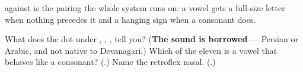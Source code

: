 \textbf{} against \textbf{} is the pairing the whole system runs on: a vowel gets a full-size letter when nothing precedes it and a hanging sign when a consonant does.

\begin{tcolorbox}[breakable,colback=teal!4,colframe=teal!35!black,title={Before you move on}]
What does the dot under \textbf{}, \textbf{}, \textbf{}, \textbf{} tell you? (\textbf{The sound is borrowed} — Persian or Arabic, and not native to Devanagari.) Which of the eleven is a vowel that behaves like a consonant? (\textbf{}.) Name the retroflex nasal. (\textbf{}.)
\end{tcolorbox}
